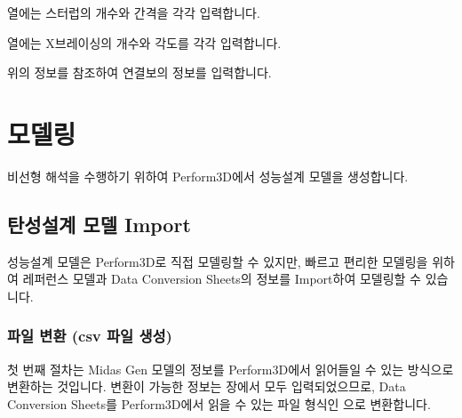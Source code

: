 \documentclass[a4paper,11pt,korean,openany,oneside]{sphinxmanual}
\begin{document}
\begin{itemize}
\begin{description}
\begin{figure}[htbp]
\centering

\noindent{}
\end{figure}

\sphinxAtStartPar
{} 열에는 스터럽의 개수와 간격을 각각 입력합니다.

\sphinxAtStartPar
{} 열에는 X\sphinxhyphen{}브레이싱의 개수와 각도를 각각 입력합니다.

\end{description}

\end{itemize}

\begin{sphinxShadowBox}

\sphinxAtStartPar
위의 정보를 참조하여 연결보의 정보를 입력합니다.
\end{sphinxShadowBox}

\sphinxstepscope


\chapter{모델링}
\label{\detokenize{3_modelling:id1}}\label{\detokenize{3_modelling::doc}}
\sphinxAtStartPar
비선형 해석을 수행하기 위하여 Perform\sphinxhyphen{}3D에서 성능설계 모델을 생성합니다.

\sphinxstepscope


\section{탄성설계 모델 Import}
\label{\detokenize{3_import:import}}\label{\detokenize{3_import::doc}}
\sphinxAtStartPar
성능설계 모델은 Perform\sphinxhyphen{}3D로 직접 모델링할 수 있지만,
빠르고 편리한 모델링을 위하여 레퍼런스 모델과 Data Conversion Sheets의 정보를 Import하여 모델링할 수 있습니다.


\subsection{파일 변환 (csv 파일 생성)}
\label{\detokenize{3_import:csv}}
\sphinxAtStartPar
첫 번째 절차는 Midas Gen 모델의 정보를 Perform\sphinxhyphen{}3D에서 읽어들일 수 있는 방식으로 변환하는 것입니다.
변환이 가능한 정보는 {\hyperref[\detokenize{1_material_setting::doc}]{}} 장에서 모두 입력되었으므로,
Data Conversion Sheets를 Perform\sphinxhyphen{}3D에서 읽을 수 있는 파일 형식인 으로 변환합니다.
\end{document}
